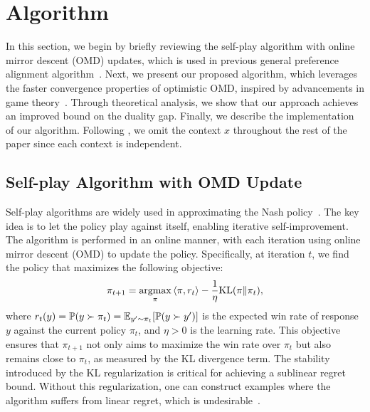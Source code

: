 \section{Algorithm}\label{sec:algo}
In this section, we begin by briefly reviewing the self-play algorithm with online mirror descent (OMD) updates, which is used in previous general preference alignment algorithm~\citep{zhang2024iterative}. Next, we present our proposed algorithm, which leverages the faster convergence properties of optimistic OMD, inspired by advancements in game theory~\citep{rakhlin2013optimization,syrgkanis2015fast}. Through theoretical analysis, we show that our approach achieves an improved bound on the duality gap. Finally, we describe the implementation of our algorithm. Following \citet{azar2024general,zhang2024iterative}, we omit the context $x$ throughout the rest of the paper since each context is independent.

\subsection{Self-play Algorithm with OMD Update}\label{sec:inpo}
Self-play algorithms are widely used in approximating the Nash policy~\citep{bai2020near,liu2021sharp}. The key idea is to let the policy play against itself, enabling iterative self-improvement. The algorithm is performed in an online manner, with each iteration using online mirror descent (OMD) to update the policy. Specifically, at iteration $t$, we find the policy that maximizes the following objective:
\begin{align}\label{eq:single_update}
\pi_{t+1}=\mathop{\mathrm{argmax}}_{\pi} \left\langle\pi,r_t\right\rangle-\frac{1}{\eta}\mathrm{KL}(\pi \Vert \pi_t),
\end{align}
where $r_t(y)=\mathbb{P}(y \succ \pi_t)=\mathbb{E}_{y' \sim \pi_t}[\mathbb{P}(y \succ y')]$ is the expected win rate of response $y$ against the current policy $\pi_t$, and $\eta>0$ is the learning rate. This objective ensures that $\pi_{t+1}$ not only aims to maximize the win rate over $\pi_t$ but also remains close to $\pi_t$, as measured by the KL divergence term. The stability introduced by the KL regularization is critical for achieving a sublinear regret bound. Without this regularization, one can construct examples where the algorithm suffers from linear regret, which is undesirable~\citep{lattimore2020bandit}.

